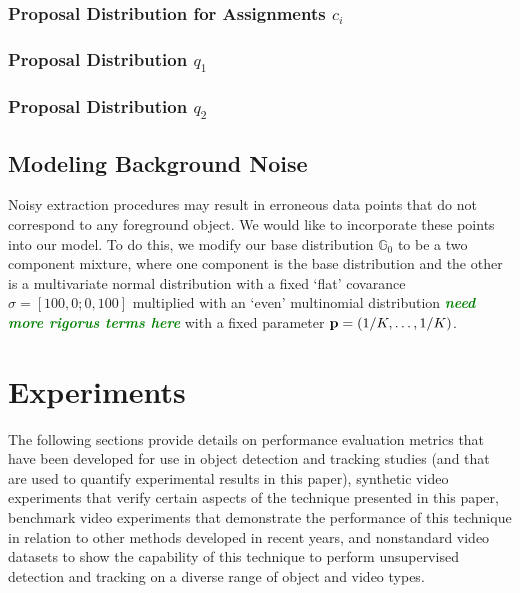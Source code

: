 \documentclass[smallcondensed, final]{svjour3}
\newcommand{\willie}[1]{\textcolor{green}{\textsf{\emph{\textbf{\textcolor{green}{#1}}}}}}
\begin{document}
\subsubsection{Proposal Distribution for Assignments $c_{i}$}


\subsubsection{Proposal Distribution $q_{1}$}


\subsubsection{Proposal Distribution $q_{2}$}







\subsection{Modeling Background Noise}

Noisy extraction procedures may result in erroneous data points that do not correspond to any foreground object. We would like to incorporate these points into our model. To do this, we modify our base distribution $\mathbb{G}_{0}$ to be a two component mixture, where one component is the base distribution and the other is a multivariate normal distribution with a fixed `flat' covarance $\sigma = [100, 0; 0, 100]$ multiplied with an `even' multinomial distribution \willie{need more rigorus terms here} with a fixed parameter $\bold{p} = (1/K, \ldots, 1/K)$.








\section{Experiments}
\label{sec:experiments}

The following sections provide details on performance evaluation metrics that have been developed for use in object detection and tracking studies (and that are used to quantify experimental results in this paper), synthetic video experiments that verify certain aspects of the technique presented in this paper, benchmark video experiments that demonstrate the performance of this technique in relation to other methods developed in recent years, and nonstandard video datasets to show the capability of this technique to perform unsupervised detection and tracking on a diverse range of object and video types.   
\end{document}

